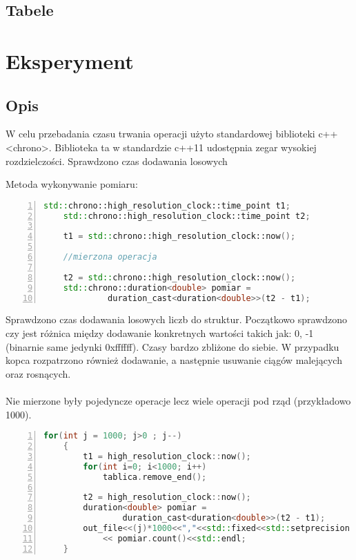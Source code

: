 \documentclass[polish, 11pt]{article}
\begin{document}
	\subsection{Tabele}
	    
	    
	    
	\section{Eksperyment}
		\subsection{Opis}
			W celu przebadania czasu trwania operacji użyto standardowej biblioteki c++ <chrono>. Biblioteka ta w standardzie c++11 udostępnia zegar wysokiej rozdzielczości. Sprawdzono czas dodawania losowych
			\par
Metoda wykonywanie pomiaru:
\begin{lstlisting}[language=C++,numbers=left]
	std::chrono::high_resolution_clock::time_point t1;
	std::chrono::high_resolution_clock::time_point t2;

	t1 = std::chrono::high_resolution_clock::now();

	//mierzona operacja

	t2 = std::chrono::high_resolution_clock::now();
	std::chrono::duration<double> pomiar =
			 duration_cast<duration<double>>(t2 - t1);

\end{lstlisting}
\par
Sprawdzono czas dodawania losowych liczb do struktur. Początkowo sprawdzono czy jest różnica między dodawanie konkretnych wartości takich jak: 0, -1 (binarnie same jedynki 0xffffff). Czasy bardzo zbliżone do siebie. W przypadku kopca rozpatrzono również dodawanie, a następnie usuwanie ciągów malejących oraz rosnących.
\paragraph{}
Nie mierzone były pojedyncze operacje lecz wiele operacji pod rząd (przykładowo 1000). 


\begin{lstlisting}[language=C++,numbers=left]
	for(int j = 1000; j>0 ; j--)
	{
		t1 = high_resolution_clock::now();
		for(int i=0; i<1000; i++)
			tablica.remove_end();
			
		t2 = high_resolution_clock::now();
		duration<double> pomiar = 
				duration_cast<duration<double>>(t2 - t1);
		out_file<<(j)*1000<<","<<std::fixed<<std::setprecision (12)
			<< pomiar.count()<<std::endl;
	}
\end{lstlisting}
\end{document}
